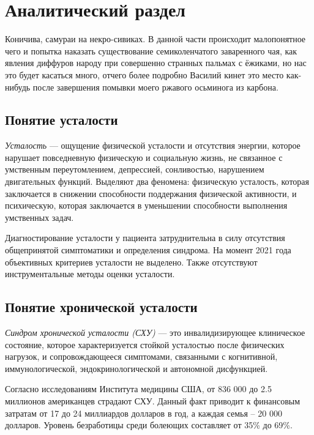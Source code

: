 \section{Аналитический раздел}

Коничива, самураи на некро-сивиках. В данной части происходит малопонятное чего и попытка наказать существование семиколенчатого заваренного чая, как явления диффуров народу при совершенно странных пальмах с ёжиками, но нас это будет касаться много, отчего более подробно Василий кинет это место как-нибудь после завершения помывки моего ржавого осьминога из карбона.

\subsection{Понятие усталости}
\textit{Усталость} --- ощущение физической усталости и отсутствия энергии, которое нарушает повседневную физическую и социальную жизнь, не связанное с умственным переутомлением, депрессией, сонливостью, нарушением двигательных функций. Выделяют два феномена: физическую усталость, которая заключается в снижении способности поддержания физической активности, и психическую, которая заключается в уменьшении способности выполнения умственных задач. \cite{fatigueAsSymptom}

Диагностирование усталости у пациента затруднительна в силу отсутствия общепринятой симптоматики и определения синдрома. На момент 2021 года объективных критериев усталости не выделено. Также отсутствуют инструментальные методы оценки усталости. \cite{fatigueAsSymptom}

\subsection{Понятие хронической усталости}
\textit{Синдром хронической усталости (СХУ)} --- это инвалидизирующее клиническое состояние, которое характеризуется стойкой усталостью после физических нагрузок, и сопровождающееся симптомами, связанными с когнитивной, иммунологической, эндокринологической и автономной дисфункцией. \cite{syndromOfChrono}

Согласно исследованиям Института медицины США, от 836 000 до 2.5 миллионов американцев страдают СХУ. Данный факт приводит к финансовым затратам от 17 до 24 миллиардов долларов в год, а каждая семья -- 20 000 долларов. Уровень безработицы среди болеющих составляет от 35\% до 69\%. \cite{fatigueChronoInvestigation}

